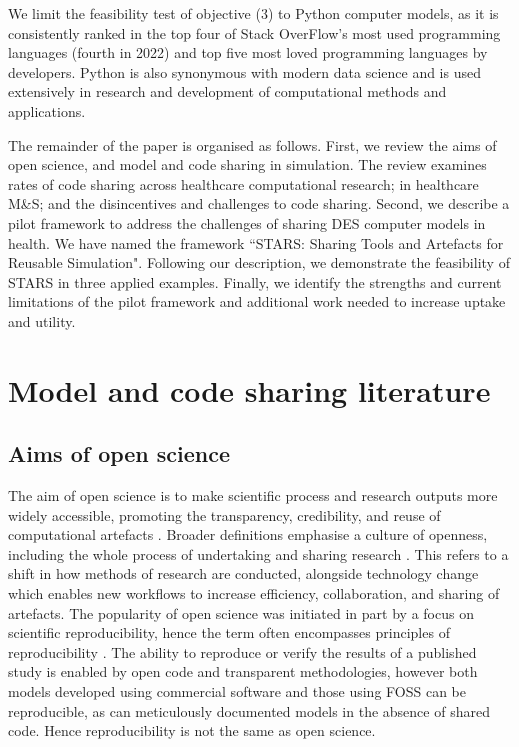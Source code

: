 \documentclass[]{interact}
\theoremstyle{plain}%
\theoremstyle{definition}
\theoremstyle{remark}
\begin{document}
We limit the feasibility test of objective (3) to Python computer models, as it is consistently ranked in the top four of Stack OverFlow's most used programming languages (fourth in 2022) and top five most loved programming languages by developers.  Python is also synonymous with modern data science and is used extensively in research and development of computational methods and applications.

The remainder of the paper is organised as follows. First, we review the aims of open science, and model and code sharing in simulation. The review examines rates of code sharing across healthcare computational research; in healthcare M\&S; and the disincentives and challenges to code sharing.  Second, we describe a pilot framework to address the challenges of sharing DES computer models in health.  We have named the framework ``STARS: Sharing Tools and Artefacts for Reusable Simulation".  Following our description, we demonstrate the feasibility of STARS in three applied examples. Finally, we identify the strengths and current limitations of the pilot framework and additional work needed to increase uptake and utility.



\section{Model and code sharing literature}
\subsection{Aims of open science}
The aim of open science is to make scientific process and research outputs more widely accessible, promoting the transparency, credibility, and reuse of computational artefacts \citep{POUWELS2022473}. Broader definitions emphasise a culture of openness, including the whole process of undertaking and sharing research \citep{Munafo2017}. This refers to a shift in how methods of research are conducted, alongside technology change which enables new workflows to increase efficiency, collaboration, and sharing of artefacts. The popularity of open science was initiated in part by a focus on scientific reproducibility, hence the term often encompasses principles of reproducibility \citep{foster2017open, Munafo2017}. The ability to reproduce or verify the results of a published study is enabled by open code and transparent methodologies, however both models developed using commercial software and those using FOSS can be reproducible, as can meticulously documented models in the absence of shared code. Hence reproducibility is not the same as open science. 
\end{document}
